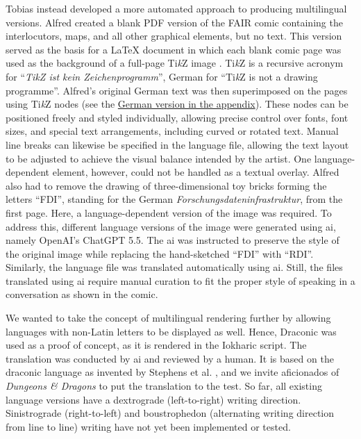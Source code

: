 \documentclass{inggrid}
\DeclareRobustCommand{\TikZ}{Ti\textit{k}Z}
\begin{document}
Tobias instead developed a more automated approach to producing multilingual versions. Alfred created a blank PDF version of the FAIR comic containing the interlocutors, maps, and all other graphical elements, but no text. This version served as the basis for a {\LaTeX} document in which each blank comic page was used as the background of a full-page {\TikZ} image \cite{Tantau_2013_book}. {\TikZ} is a recursive acronym for \enquote{\textit{{\TikZ} ist kein Zeichenprogramm}}, German for \enquote{{\TikZ} is not a drawing programme}. Alfred's original German text was then superimposed on the pages using {\TikZ} nodes (see the \hyperref[comic:deu]{German version in the appendix}). 
These nodes can be positioned freely and styled individually, allowing precise control over fonts, font sizes, and special text arrangements, including curved or rotated text. Manual line breaks can likewise be specified in the language file, allowing the text layout to be adjusted to achieve the visual balance intended by the artist. 
One language-dependent element, however, could not be handled as a textual overlay. 
Alfred also had to remove the drawing of three-dimensional toy bricks forming the letters \enquote{FDI}, standing for the German \textit{Forschungsdateninfrastruktur}, from the first page. 
Here, a language-dependent version of the image was required. 
To address this, different language versions of the image were generated using \ac{ai}, namely OpenAI's ChatGPT 5.5. 
The \ac{ai} was instructed to preserve the style of the original image while replacing the hand-sketched \enquote{FDI} with \enquote{RDI}.
Similarly, the language file was translated automatically using \ac{ai}. 
Still, the files translated using \ac{ai} require manual curation to fit the proper style of speaking in a conversation as shown in the comic.

We wanted to take the concept of multilingual rendering further by allowing languages with non-Latin letters to be displayed as well.
Hence, Draconic was used as a proof of concept, as it is rendered in the Iokharic script. 
The translation was conducted by \ac{ai} and reviewed by a human.
It is based on the draconic language as invented by Stephens et al. \cite{STEP01, MOSB26}, and we invite aficionados of \textit{Dungeons \& Dragons} to put the translation to the test.
So far, all existing language versions have a dextrograde (left-to-right) writing direction. 
Sinistrograde (right-to-left) and boustrophedon (alternating writing direction from line to line) writing have not yet been implemented or tested.
\end{document}
